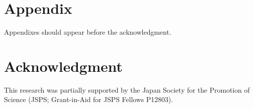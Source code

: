 \documentclass[letterpaper, 10 pt, conference]{ieeeconf}  %
\begin{document}






\section*{Appendix}

Appendixes should appear before the acknowledgment.

\section*{Acknowledgment}

This research was partially supported by the Japan Society for the
Promotion of Science (JSPS; Grant-in-Aid for JSPS Fellows P12803).





\end{document}
